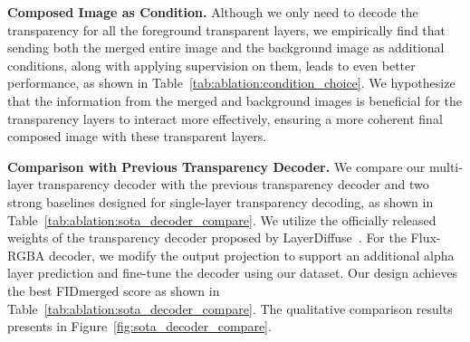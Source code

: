 \vspace{1mm}
\noindent\textbf{Composed Image as Condition.} Although we only need to decode the transparency for all the foreground transparent layers, we empirically find that sending both the merged entire image and the background image as additional conditions, along with applying supervision on them, leads to even better performance, as shown in Table~\ref{tab:ablation:condition_choice}. We hypothesize that the information from the merged and background images is beneficial for the transparency layers to interact more effectively, ensuring a more coherent final composed image with these transparent layers.

\vspace{1mm}
\noindent\textbf{Comparison with Previous Transparency Decoder.}
We compare our multi-layer transparency decoder with the previous transparency decoder and two strong baselines designed for single-layer transparency decoding, as shown in Table~\ref{tab:ablation:sota_decoder_compare}. We utilize the officially released weights of the transparency decoder proposed by LayerDiffuse~\cite{zhang2024transparent}. For the Flux-RGBA decoder, we modify the output projection to support an additional alpha layer prediction and fine-tune the decoder using our dataset. Our design achieves the best FID$\scriptstyle \text{merged}$ score as shown in Table~\ref{tab:ablation:sota_decoder_compare}. The qualitative comparison results presents in Figure~\ref{fig:sota_decoder_compare}.